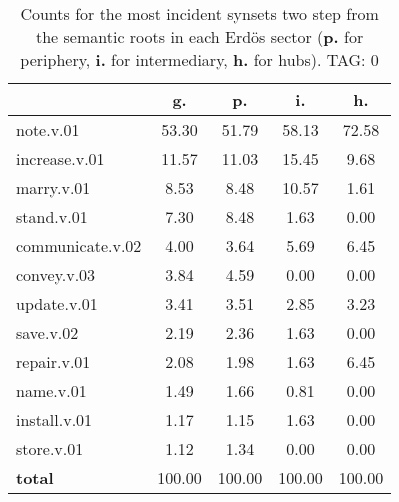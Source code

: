 \begin{table}[h!]
\begin{center}
\begin{tabular}{| l || c | c | c | c |}\hline
 & {\bf g.} & {\bf p.} & {\bf i.} & {\bf h.} \\\hline\hline
note.v.01 & 53.30  & 51.79  & 58.13  & 72.58 \\\hline
increase.v.01 & 11.57  & 11.03  & 15.45  & 9.68 \\\hline
marry.v.01 & 8.53  & 8.48  & 10.57  & 1.61 \\\hline
stand.v.01 & 7.30  & 8.48  & 1.63  & 0.00 \\\hline
communicate.v.02 & 4.00  & 3.64  & 5.69  & 6.45 \\\hline
convey.v.03 & 3.84  & 4.59  & 0.00  & 0.00 \\\hline
update.v.01 & 3.41  & 3.51  & 2.85  & 3.23 \\\hline
save.v.02 & 2.19  & 2.36  & 1.63  & 0.00 \\\hline
repair.v.01 & 2.08  & 1.98  & 1.63  & 6.45 \\\hline
name.v.01 & 1.49  & 1.66  & 0.81  & 0.00 \\\hline
install.v.01 & 1.17  & 1.15  & 1.63  & 0.00 \\\hline
store.v.01 & 1.12  & 1.34  & 0.00  & 0.00 \\\hline\hline
{{\bf total}} & 100.00  & 100.00  & 100.00  & 100.00 \\\hline
\end{tabular}
\caption{Counts for the most incident synsets two step from the semantic roots in each Erd\"os sector ({\bf p.} for periphery, {\bf i.} for intermediary, {\bf h.} for hubs). TAG: 0}
\end{center}
\end{table}